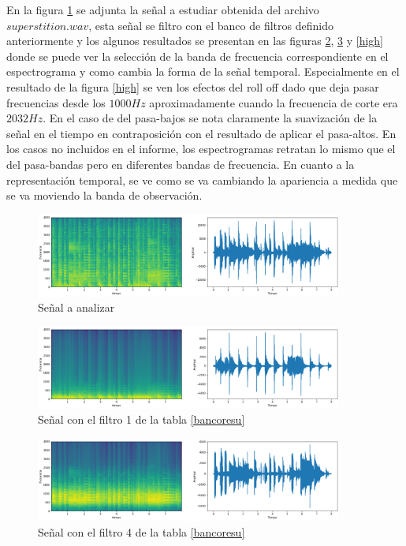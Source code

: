 \documentclass[a4paper]{article}
\begin{document}
\newline
En la figura \ref{super} se adjunta la señal a estudiar obtenida del archivo $superstition.wav$, esta señal se filtro con el banco de filtros definido anteriormente y los algunos resultados se presentan en las figuras \ref{low}, \ref{band} y \ref{high} donde se puede ver la selección de la banda de frecuencia correspondiente en el espectrograma y como cambia la forma de la señal temporal. Especialmente en el resultado de la figura \ref{high} se ven los efectos del roll off dado que deja pasar frecuencias desde los $1000Hz$ aproximadamente cuando la frecuencia de corte era $2032Hz$. En el caso de del pasa-bajos se nota claramente la suavización de la señal en el tiempo en contraposición con el resultado de aplicar el pasa-altos. En los casos no incluidos en el informe, los espectrogramas retratan lo mismo que el del pasa-bandas pero en diferentes bandas de frecuencia. En cuanto a la representación temporal, se ve como se va cambiando la apariencia a medida que se va moviendo la banda de observación. 
\begin{figure}[h!]
\centering
\includegraphics[width=0.9\textwidth]{superstition.png}
\caption{Señal a analizar}
\label{super}
\end{figure}
\begin{figure}[h!]
\centering
\includegraphics[width=0.9\textwidth]{lowpass.png}
\caption{Señal con el filtro 1 de la tabla \ref{bancoresu}}
\label{low}
\end{figure}
\begin{figure}[h!]
\centering
\includegraphics[width=0.9\textwidth]{bandpass4.png}
\caption{Señal con el filtro 4 de la tabla \ref{bancoresu}}
\label{band}
\end{figure}
\end{document}
